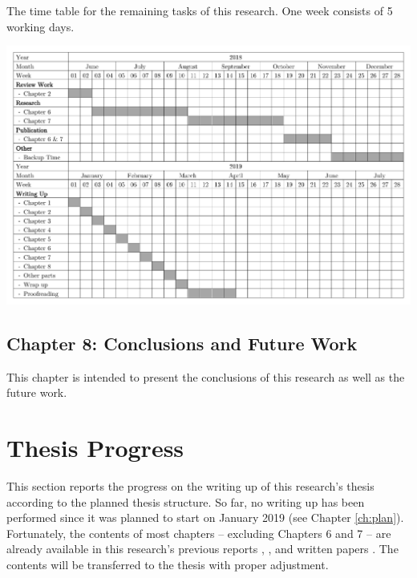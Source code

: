 \documentclass[12pt, a4paper]{report} \usepackage[titletoc]{appendix}
\begin{document}
\begin{landscape}

\begin{table}[h]
\centering
\caption{The time table for the remaining tasks of this research. One week consists of 5 working days. }
\label{table:timetable}
\centering
\includegraphics[width=0.95\linewidth]{images/timetable}
\label{fig:timetable}
\end{table}
\end{landscape}


\section{Chapter 8: Conclusions and Future Work}
\label{sec:chapter_8_conclusions}
This chapter is intended to present the conclusions of this research as well as the future work. 


\chapter{Thesis Progress}
\label{sec:thesis_progress}
This section reports the progress on the writing up of this research's thesis according to the planned thesis structure. So far, no writing up has been performed since it was planned to start on January 2019 (see Chapter \ref{ch:plan}). Fortunately, the contents of most chapters -- excluding Chapters 6 and 7 -- are already available in this research's previous reports \cite{yohannis2017progress}, \cite{yohannis2018outline}, and written papers \cite{DBLP:conf/models/YohannisKP17,yohannis2018towards,DBLP:conf/models/YohannisRPK18}. The contents will be transferred to the thesis with proper adjustment.
\end{document}
